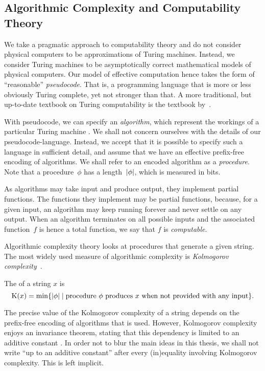 \subsection{Algorithmic Complexity and Computability Theory}

We take a pragmatic approach to computability theory and do not consider physical computers to be approximations of Turing machines.
Instead, we consider Turing machines to be asymptotically correct mathematical models of physical computers.
Our model of effective computation hence takes the form of \enquote{reasonable} \emph{pseudocode}.
That is, a programming language that is more or less obviously Turing complete, yet not stronger than that.
A more traditional, but up-to-date textbook on Turing computability is the textbook by~\textcite{soare2016turing}.

With pseudocode, we can specify an \emph{algorithm}, which represent the workings of a particular Turing machine \parencite[see also][]{rogers1967theory}.
We shall not concern ourselves with the details of our pseudocode-language.
Instead, we accept that it is possible to specify such a language in sufficient detail, and assume that we have an effective prefix-free encoding of algorithms.
We shall refer to an encoded algorithm as a \emph{procedure}.
Note that a procedure~$\phi$ has a length~${\lvert\phi\rvert}$, which is measured in bits.

As algorithms may take input and produce output, they implement partial functions.
The functions they implement may be partial functions, because, for a given input, an algorithm may keep running forever and never settle on any output.
When an algorithm terminates on all possible inputs and the associated function~$f$ is hence a total function, we say that $f$ is \emph{computable}.

Algorithmic complexity theory looks at procedures that generate a given string.
The most widely used measure of algorithmic complexity is \emph{Kolmogorov complexity}~\parencite{cover2006elements,li2008introduction,downey2010algorithmic}.
\begin{definition}
  The  of a string $x$ is
  \begin{equation*}
    \operatorname{K}(x) = \min\{{\lvert\phi\rvert} \;|\; \text{procedure $\phi$ produces $x$ when not provided with any input}\}.
  \end{equation*}
\end{definition}

The precise value of the Kolmogorov complexity of a string depends on the prefix-free encoding of algorithms that is used.
However, Kolmogorov complexity enjoys an invariance theorem, stating that this dependency is limited to an additive constant \parencite[see, for instance][]{li2008introduction}.
In order not to blur the main ideas in this thesis, we shall not write \enquote{up to an additive constant} after every (in)equality involving Kolmogorov complexity.
This is left implicit.


